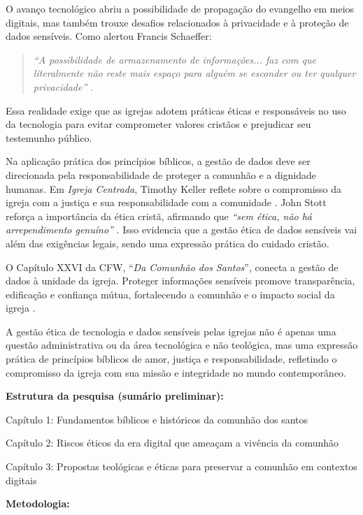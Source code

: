 \documentclass[12pt,a4paper]{article}
\begin{document}
O avanço tecnológico abriu a possibilidade de propagação do evangelho em meios digitais, mas também trouxe desafios relacionados à privacidade e à proteção de dados sensíveis. Como alertou Francis Schaeffer:

\begin{quote}
\textit {``A possibilidade de armazenamento de informações... faz com que literalmente não reste mais espaço para alguém se esconder ou ter qualquer privacidade''} \cite[p. 180]{schaeffer2002}.
\end{quote}

Essa realidade exige que as igrejas adotem práticas éticas e responsáveis no uso da tecnologia para evitar comprometer valores cristãos e prejudicar seu testemunho público.

Na aplicação prática dos princípios bíblicos, a gestão de dados deve ser direcionada pela responsabilidade de proteger a comunhão e a dignidade humanas. Em \textit{Igreja Centrada}, Timothy Keller reflete sobre o compromisso da igreja com a justiça e sua responsabilidade com a comunidade \cite[p. 209]{keller2014}. John Stott reforça a importância da ética cristã, afirmando que \textit {``sem ética, não há arrependimento genuíno''} \cite[p. 51]{stott2008}. Isso evidencia que a gestão ética de dados sensíveis vai além das exigências legais, sendo uma expressão prática do cuidado cristão.

O Capítulo XXVI da CFW, ``\textit{Da Comunhão dos Santos}'', conecta a gestão de dados à unidade da igreja. Proteger informações sensíveis promove transparência, edificação e confiança mútua, fortalecendo a comunhão e o impacto social da igreja \cite{cfw}.

A gestão ética de tecnologia e dados sensíveis pelas igrejas não é apenas uma questão administrativa ou da área tecnológica e não teológica, mas uma expressão prática de princípios bíblicos de amor, justiça e responsabilidade, refletindo o compromisso da igreja com sua missão e integridade no mundo contemporâneo.

\noindent
\textbf{Estrutura da pesquisa (sumário preliminar):}

\noindent
Capítulo 1: Fundamentos bíblicos e históricos da comunhão dos santos

\noindent
Capítulo 2: Riscos éticos da era digital que ameaçam a vivência da comunhão

\noindent
Capítulo 3: Propostas teológicas e éticas para preservar a comunhão em contextos digitais

\noindent
\textbf{Metodologia:}
\end{document}
